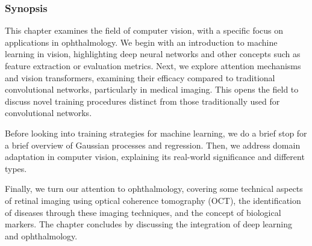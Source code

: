 \subsubsection{Synopsis} This chapter examines the field of computer vision, with a specific focus on applications in ophthalmology. We begin with an introduction to machine learning in vision, highlighting deep neural networks and other concepts such as feature extraction or evaluation metrics. Next, we explore attention mechanisms and vision transformers, examining their efficacy compared to traditional convolutional networks, particularly in medical imaging. This opens the field to discuss novel training procedures distinct from those traditionally used for convolutional networks. 

Before looking into training strategies for machine learning, we do a brief stop for a brief overview of Gaussian processes and regression. Then, we address domain adaptation in computer vision, explaining its real-world significance and different types.

Finally, we turn our attention to ophthalmology, covering some technical aspects of retinal imaging using optical coherence tomography (OCT), the identification of diseases through these imaging techniques, and the concept of biological markers. The chapter concludes by discussing the integration of deep learning and ophthalmology.






